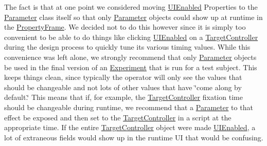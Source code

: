 The fact is that at one point we considered moving \hyperlink{class_picto_1_1_u_i_enabled}{U\-I\-Enabled} Properties to the \hyperlink{class_picto_1_1_parameter}{Parameter} class itself so that only \hyperlink{class_picto_1_1_parameter}{Parameter} objects could show up at runtime in the \hyperlink{class_property_frame}{Property\-Frame}. We decided not to do this however since it is simply too convenient to be able to do things like clicking \hyperlink{class_picto_1_1_u_i_enabled}{U\-I\-Enabled} on a \hyperlink{class_picto_1_1_target_controller}{Target\-Controller} during the design process to quickly tune its various timing values. While this convenience was left alone, we strongly recommend that only \hyperlink{class_picto_1_1_parameter}{Parameter} objects be used in the final version of an \hyperlink{class_picto_1_1_experiment}{Experiment} that is run for a test subject. This keeps things clean, since typically the operator will only see the values that should be changeable and not lots of other values that have \char`\"{}come along by default.\char`\"{} This means that if, for example, the \hyperlink{class_picto_1_1_target_controller}{Target\-Controller} fixation time should be changeable during runtime, we recommend that a \hyperlink{class_picto_1_1_parameter}{Parameter} to that effect be exposed and then set to the \hyperlink{class_picto_1_1_target_controller}{Target\-Controller} in a script at the appropriate time. If the entire \hyperlink{class_picto_1_1_target_controller}{Target\-Controller} object were made \hyperlink{class_picto_1_1_u_i_enabled}{U\-I\-Enabled}, a lot of extraneous fields would show up in the runtime U\-I that would be confusing.

